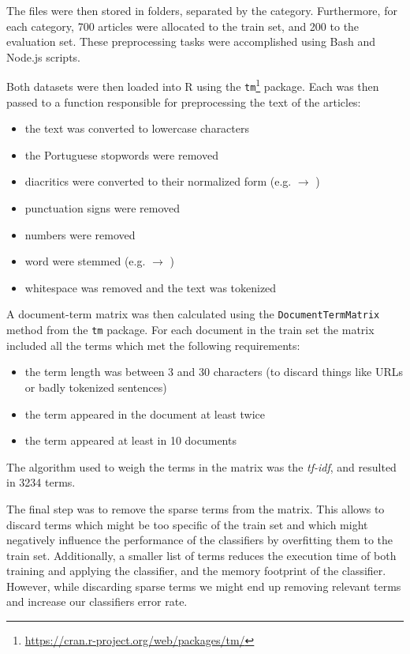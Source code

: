 \documentclass[conference]{IEEEtran}
\begin{document}
The files were then stored in folders, separated by the category.
Furthermore, for each category, 700 articles were allocated to the
train set, and 200 to the evaluation set. These preprocessing tasks
were accomplished using Bash and Node.js scripts.

Both datasets were then loaded into R using the
\texttt{tm}\footnote{\url{https://cran.r-project.org/web/packages/tm/}}
package. Each was then passed to a function responsible for
preprocessing the text of the articles:

\begin{itemize}
    \item the text was converted to lowercase characters
    \item the Portuguese stopwords were removed
    \item diacritics were converted to their normalized form (e.g.
         $\rightarrow$ )
    \item punctuation signs were removed
    \item numbers were removed
    \item word were stemmed (e.g.  $\rightarrow$
        )
    \item whitespace was removed and the text was tokenized
\end{itemize}

A document-term matrix was then calculated using the
\texttt{DocumentTermMatrix} method from the \texttt{tm} package.
For each document in the train set the matrix included all the
terms which met the following requirements:

\begin{itemize}
    \item the term length was between 3 and 30 characters (to discard
        things like URLs or badly tokenized sentences)
    \item the term appeared in the document at least twice
    \item the term appeared at least in 10 documents
\end{itemize}
The algorithm used to weigh the terms in the matrix was the
\textit{tf-idf}, and resulted in 3234 terms.


The final step was to remove the sparse terms from the matrix.
This allows to discard terms which might be too specific of the train
set and which might negatively influence the performance of the
classifiers by overfitting them to the train set. Additionally, a
smaller list of terms reduces the execution time of both training and
applying the classifier, and the memory footprint of the classifier.
However, while discarding sparse terms we might end up removing
relevant terms and increase our classifiers error rate.
\end{document}
